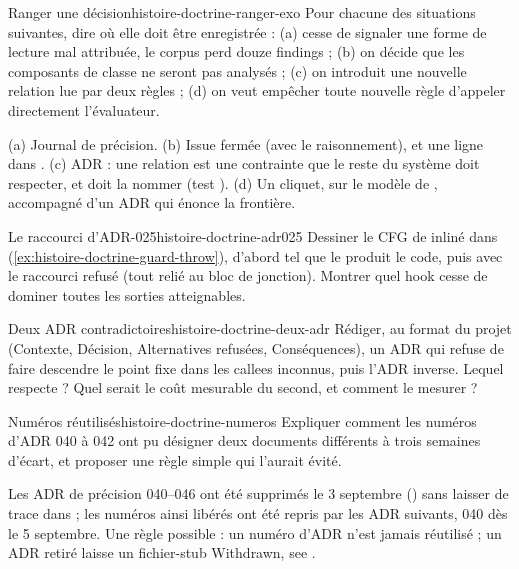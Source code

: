 \begin{exercice}{Ranger une décision}{histoire-doctrine-ranger-exo}
Pour chacune des situations suivantes, dire où elle doit être enregistrée : (a)  cesse de signaler une forme de lecture mal attribuée, le corpus perd douze findings ; (b) on décide que les composants de classe ne seront pas analysés ; (c) on introduit une nouvelle relation  lue par deux règles ; (d) on veut empêcher toute nouvelle règle d'appeler directement l'évaluateur.
\end{exercice}
\begin{solution}
(a) Journal de précision. (b) Issue fermée  (avec le raisonnement), et une ligne dans . (c) ADR : une relation est une contrainte que le reste du système doit respecter, et  doit la nommer (test ). (d) Un cliquet, sur le modèle de , accompagné d'un ADR qui énonce la frontière.
\end{solution}

\begin{exercice}{Le raccourci d'ADR-025}{histoire-doctrine-adr025}
Dessiner le CFG de  inliné dans  (\cref{ex:histoire-doctrine-guard-throw}), d'abord tel que le produit le code, puis avec le raccourci refusé (tout  relié au bloc de jonction). Montrer quel hook cesse de dominer toutes les sorties atteignables.
\end{exercice}

\begin{exercice}{Deux ADR contradictoires}{histoire-doctrine-deux-adr}
Rédiger, au format du projet (Contexte, Décision, Alternatives refusées, Conséquences), un ADR qui refuse de faire descendre le point fixe dans les callees inconnus, puis l'ADR inverse. Lequel respecte  ? Quel serait le coût mesurable du second, et comment le mesurer ?
\end{exercice}

\begin{exercice}{Numéros réutilisés}{histoire-doctrine-numeros}
Expliquer comment les numéros d'ADR 040 à 042 ont pu désigner deux documents différents à trois semaines d'écart, et proposer une règle simple qui l'aurait évité.
\end{exercice}
\begin{solution}
Les ADR de précision 040--046 ont été supprimés le 3 septembre () sans laisser de trace dans  ; les numéros ainsi libérés ont été repris par les ADR suivants, 040 dès le 5 septembre. Une règle possible : un numéro d'ADR n'est jamais réutilisé ; un ADR retiré laisse un fichier-stub \og Withdrawn, see \fg{}.
\end{solution}
